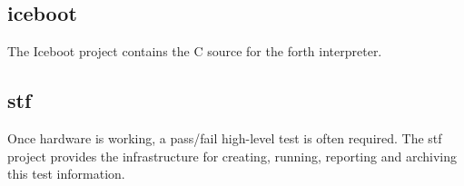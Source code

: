 \documentclass{article}
\begin{document}
        \subsection{iceboot}

The Iceboot project contains the C source for
the forth interpreter.

        \subsection{stf}

 Once hardware is working, a pass/fail high-level test
is often required.  The stf project provides the infrastructure
for creating, running, reporting and archiving this test
information.

\printindex
\end{document}
